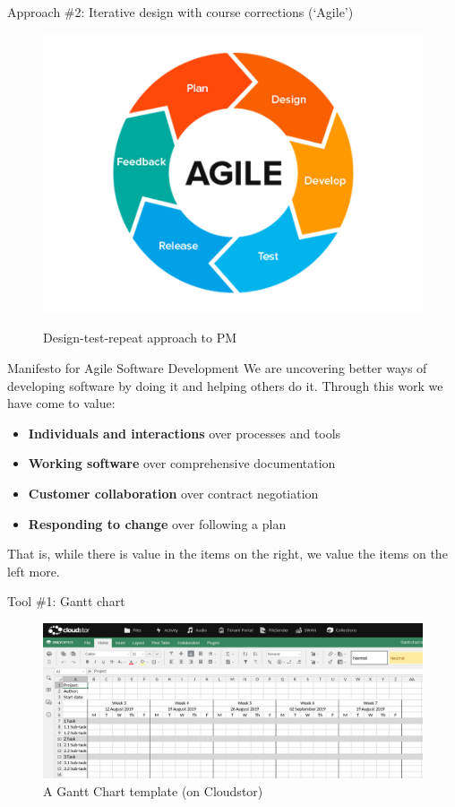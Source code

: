 \documentclass[aspectratio=43, 11pt]{beamer} %
\begin{document}
\begin{frame}{Approach \#2: Iterative design with course corrections (`Agile')}
 \begin{figure}[Agile]
    \centering
        \includegraphics[height=.75\textheight]{figures/agile.png}
        \caption{Design-test-repeat approach to PM} \cite{Parody2018-if}
        \label{fig:7}
 \end{figure}
\end{frame}

\begin{frame}{Manifesto for Agile Software Development}
We are uncovering better ways of developing software by doing it and helping others do it. Through this work we have come to value:
    \begin{itemize}[label=\textbullet]
        \item \textbf{Individuals and interactions} over processes and tools
        \item \textbf{Working software} over comprehensive documentation
        \item \textbf{Customer collaboration} over contract negotiation
        \item \textbf{Responding to change} over following a plan
    \end{itemize}
That is, while there is value in the items on the right, we value the items on the left more. \cite{Atlassian2019-xl}
\end{frame}

\begin{frame}{Tool \#1: Gantt chart}
 \begin{figure}[Gantt]
    \centering
        \includegraphics[height=.75\textheight]{figures/gantt.png}
        \caption{A Gantt Chart template (on Cloudstor)}
        \label{fig:8}
 \end{figure}
\end{frame}
\end{document}

